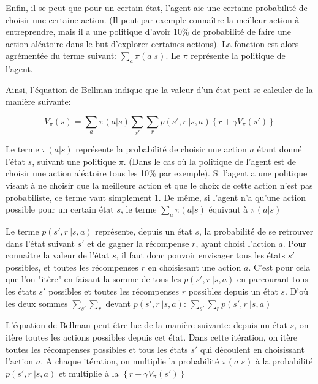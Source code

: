 \documentclass[11pt,a4paper]{report}
\begin{document}
    \par Enfin, il se peut que pour un certain état, l'agent aie une certaine probabilité de choisir une certaine action. (Il peut par exemple connaître la meilleur action à entreprendre, mais il a une politique d'avoir 10\% de probabilité de faire une action aléatoire dans le but d'explorer certaines actions). La fonction est alors agrémentée du terme suivant: $\sum_a\pi(a|s)$. Le $\pi$ représente la politique de l'agent.
    
    \par Ainsi, l'équation de Bellman indique que la valeur d'un état peut se calculer de la manière suivante: 
    
    $$V_\pi(s) = \sum_a\pi(a|s)\sum_{s'}\sum_rp(s',r\ |s,a)\left\{r+\gamma V_\pi(s')\right\}$$
    
    \par Le terme $\pi(a|s)$ représente la probabilité de choisir une action $a$ étant donné l'état $s$, suivant une politique $\pi$. (Dans le cas où la politique de l'agent est de choisir une action aléatoire tous les 10\% par exemple). Si l'agent a une politique visant à ne choisir que la meilleure action et que le choix de cette action n'est pas probabiliste, ce terme vaut simplement 1. De même, si l'agent n'a qu'une action possible pour un certain état $s$, le terme $\sum_a\pi(a|s)$ équivaut à $\pi(a|s)$
    
    \par Le terme $p(s',r\ |s,a)$ représente, depuis un état $s$, la probabilité de se retrouver dans l'état suivant $s'$ et de gagner la récompense $r$, ayant choisi l'action $a$. Pour connaître la valeur de l'état $s$, il faut donc pouvoir envisager tous les états $s'$ possibles, et toutes les récompenses $r$ en choisissant une action $a$. C'est pour cela que l'on "itère" en faisant la somme de tous les $p(s',r\ |s,a)$ en parcourant tous les états $s'$ possibles et toutes les récompenses $r$ possibles depuis un état $s$. D'où les deux sommes $\sum_{s'}\sum_r$ devant $p(s',r\ |s,a)$:  $\sum_{s'}\sum_rp(s',r\ |s,a)$
    
    \par L'équation de Bellman peut être lue de la manière suivante: depuis un état $s$, on itère toutes les actions possibles depuis cet état. Dans cette itération, on itère toutes les récompenses possibles et tous les états $s'$ qui découlent en choisissant l'action $a$. A chaque itération, on multiplie la probabilité $\pi(a|s)$ à la probabilité $p(s',r\ |s,a)$ et multiplie à la $\left\{r+\gamma V_\pi(s')\right\}$
    
\end{document}
